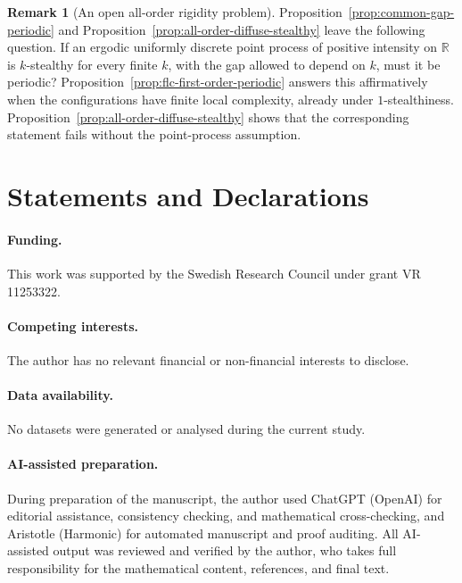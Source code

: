 \documentclass[11pt,reqno,a4paper]{amsart}
\numberwithin{equation}{section}
\theoremstyle{compact}
\theoremstyle{definition}
\theoremstyle{definition}
\newtheorem{remark}[theorem]{Remark}
\begin{document}
\begin{remark}[An open all-order rigidity problem]
\label{rem:all-order-open-question}
Proposition~\ref{prop:common-gap-periodic} and
Proposition~\ref{prop:all-order-diffuse-stealthy} leave the following question.
If an ergodic uniformly discrete point process of positive intensity on
$\mathbb R$ is $k$-stealthy for every finite $k$, with the gap allowed
to depend on \(k\), must it be periodic?  Proposition~\ref{prop:flc-first-order-periodic} answers this affirmatively when the
configurations have finite local complexity, already under $1$-stealthiness.  Proposition~\ref{prop:all-order-diffuse-stealthy} shows that
the corresponding statement fails without the point-process assumption.
\end{remark}


\section*{Statements and Declarations}

\paragraph{\textbf{Funding.}}
This work was supported by the Swedish Research Council under grant
VR 11253322.

\paragraph{\textbf{Competing interests.}}
The author has no relevant financial or non-financial interests to disclose.

\paragraph{\textbf{Data availability.}}
No datasets were generated or analysed during the current study.

\paragraph{\textbf{AI-assisted preparation.}}
During preparation of the manuscript, the author used ChatGPT (OpenAI) for
editorial assistance, consistency checking, and mathematical cross-checking,
and Aristotle (Harmonic) for automated manuscript and proof auditing.  All
AI-assisted output was reviewed and verified by the author, who takes full
responsibility for the mathematical content, references, and final text.
\end{document}
